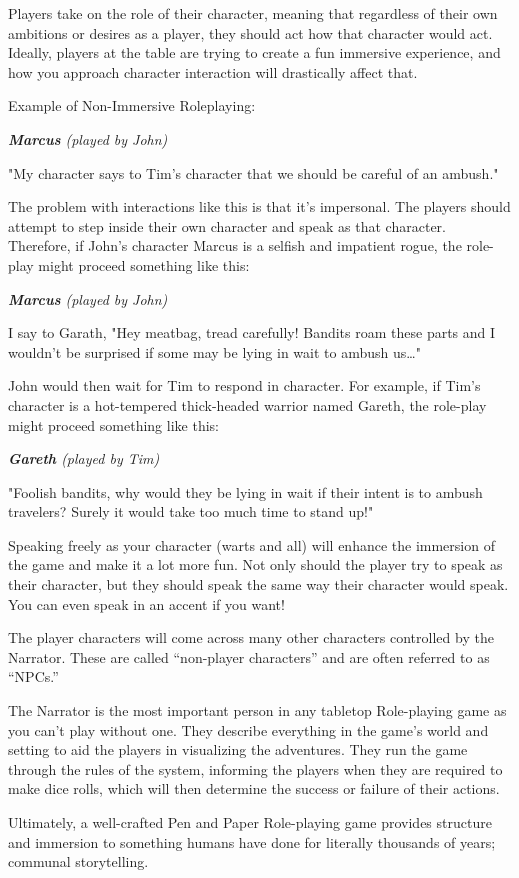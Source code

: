 Players take on the role of their character, meaning that regardless of their own ambitions or desires as a player, they should act how that character would act. Ideally, players at the table are trying to create a fun immersive experience, and how you approach character interaction will drastically affect that.

Example of Non-Immersive Roleplaying:

\begin{displayquote}
\textit{ \textbf{Marcus} (played by John)}

"My character says to Tim's character that we should be careful of an ambush."
\end{displayquote}


The problem with interactions like this is that it’s impersonal. The players should attempt to step inside their own character and speak as that character. Therefore, if John’s character Marcus is a selfish and impatient rogue, the role-play might proceed something like this:

\begin{displayquote}
    \textit{ \textbf{Marcus} (played by John)}
    
    I say to Garath, "Hey meatbag, tread carefully! Bandits roam these parts and I wouldn't be surprised if some may be lying in wait to ambush us…"
\end{displayquote}

John would then wait for Tim to respond in character. For example, if Tim’s character is a hot-tempered thick-headed warrior named Gareth, the role-play might proceed something like this:

\begin{displayquote}
    \textit{ \textbf{Gareth} (played by Tim)}
    
    "Foolish bandits, why would they be lying in wait if their intent is to ambush travelers? Surely it would take too much time to stand up!"
\end{displayquote}

Speaking freely as your character (warts and all) will enhance the immersion of the game and make it a lot more fun. Not only should the player try to speak as their character, but they should speak the same way their character would speak. You can even speak in an accent if you want!

The player characters will come across many other characters controlled by the Narrator. These are called “non-player characters” and are often referred to as “NPCs.”

The Narrator is the most important person in any tabletop Role-playing game as you can’t play without one. They describe everything in the game’s world and setting to aid the players in visualizing the adventures. They run the game through the rules of the system, informing the players when they are required to make dice rolls, which will then determine the success or failure of their actions.

Ultimately, a well-crafted Pen and Paper Role-playing game provides structure and immersion to something humans have done for literally thousands of years; communal storytelling.